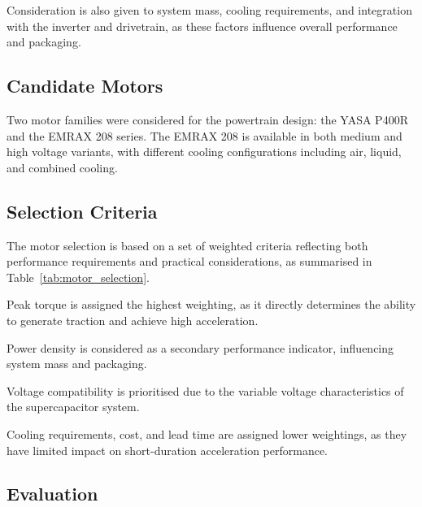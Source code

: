 \documentclass[11pt, a4paper]{report}
\numberwithin{equation}{section}
\begin{document}
Consideration is also given to system mass, cooling requirements, and integration with the inverter and drivetrain, as these factors influence overall performance and packaging.

\subsection{Candidate Motors}

Two motor families were considered for the powertrain design: the YASA P400R \cite{YASA_P400R_data_sheet} and the EMRAX 208 series\cite{EMRAX_208_data_sheet}. 
The EMRAX 208 is available in both medium and high voltage variants, with different cooling configurations including air, liquid, and combined cooling.

\subsection{Selection Criteria}

The motor selection is based on a set of weighted criteria reflecting both performance requirements and practical considerations, as summarised in Table~\ref{tab:motor_selection}.

Peak torque is assigned the highest weighting, as it directly determines the ability to generate traction and achieve high acceleration.

Power density is considered as a secondary performance indicator, influencing system mass and packaging.

Voltage compatibility is prioritised due to the variable voltage characteristics of the supercapacitor system.

Cooling requirements, cost, and lead time are assigned lower weightings, as they have limited impact on short-duration acceleration performance.

\subsection{Evaluation}
\end{document}
